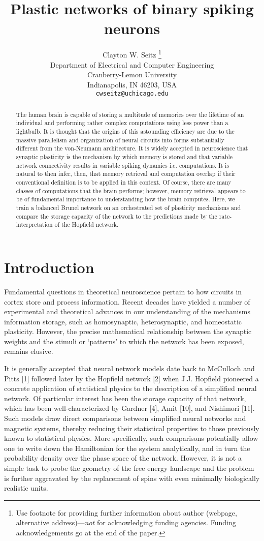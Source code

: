\documentclass{article} %
\title{Plastic networks of binary spiking neurons}
\author{Clayton W. Seitz \thanks{ Use footnote for providing further information
about author (webpage, alternative address)---\emph{not} for acknowledging
funding agencies.  Funding acknowledgements go at the end of the paper.} \\
Department of Electrical and Computer Engineering\\
Cranberry-Lemon University\\
Indianapolis, IN 46203, USA \\
\texttt{cwseitz@uchicago.edu} \\
}
\begin{document}
\maketitle

\begin{abstract}
The human brain is capable of storing a multitude of memories over the lifetime of an individual and performing rather complex computations using less power than a lightbulb. It is thought that the origins of this astounding efficiency are due to the massive parallelism and organization of neural circuits into forms substantially different from the von-Neumann architecture. It is widely accepted in neuroscience that synaptic plasticity is the mechanism by which memory is stored and that variable network connectivity results in variable spiking dynamics i.e. computations. It is natural to then infer, then, that memory retrieval and computation overlap if their conventional definition is to be applied in this context. Of course, there are many classes of computations that the brain performs; however, memory retrieval appears to be of fundamental importance to understanding how the brain computes. Here, we train a balanced Brunel network on an orchestrated set of plasticity mechanisms and compare the storage capacity of the network to the predictions made by the rate-interpretation of the Hopfield network.
\end{abstract}

\section{Introduction}

Fundamental questions in theoretical neuroscience pertain to how circuits in cortex store and process information. Recent decades have yielded a number of experimental and theoretical advances in our understanding of the mechanisms information storage, such as homosynaptic, heterosynaptic, and homeostatic plasticity. However, the precise mathematical relationship between the synaptic weights and the stimuli or `patterns' to which the network has been exposed, remains elusive. 

It is generally accepted that neural network models date back to McCulloch and Pitts [1] followed later by the Hopfield network [2] when J.J. Hopfield pioneered a concrete application of statistical physics to the description of a simplified neural network. Of particular interest has been the storage capacity of that network, which has been well-characterized by Gardner [4], Amit [10], and Nishimori [11]. Such models draw direct comparisons between simplified neural networks and magnetic systems, thereby reducing their statistical properties to those previously known to statistical physics. More specifically, such comparisons potentially allow one to write down the Hamiltonian for the system analytically, and in turn the probability density over the phase space of the network. However, it is not a simple task to probe the geometry of the free energy landscape and the problem is further aggravated by the replacement of spins with even minimally biologically realistic units. 
\end{document}
